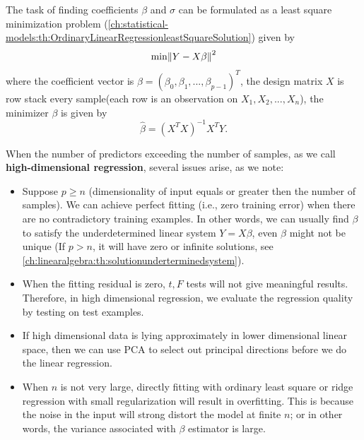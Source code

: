 \begin{refsection}
The task of finding coefficients $\beta$ and $\sigma$ can be formulated as a least square minimization problem (\autoref{ch:statistical-models:th:OrdinaryLinearRegressionleastSquareSolution}) given by
$$\min \norm{Y-X\beta}^2$$
where the coefficient vector is $\beta = (\beta_0,\beta_1,...,\beta_{p-1})^T$, the design matrix $X$ is row stack every sample(each row is an observation on $X_1,X_2,...,X_n$), the minimizer $\beta$ is given by
$$\hat{\beta} = (X^TX)^{-1}X^TY.$$

When the number of predictors exceeding the number of samples, as we call \textbf{high-dimensional regression}, several issues arise, as we note:
\begin{remark}\cite[241]{james2013introduction}
	\begin{itemize}
		\item 	Suppose $p \geq n$ (dimensionality of input equals or greater then the number of samples). We can achieve perfect fitting (i.e., zero training error) when there are no contradictory training examples. In other words, we can usually find $\beta$ to satisfy the underdetermined linear system $Y=X\beta$, even $\beta$ might not be unique (If $p>n$, it will have zero or infinite solutions, see \autoref{ch:linearalgebra:th:solutionunderterminedsystem}).
		\item When the fitting residual is zero,  $t,F$ tests will not give meaningful results. Therefore, in high dimensional regression, we evaluate the regression quality by testing on test examples.
	\end{itemize}
\end{remark}


\begin{remark}\hfill
	\begin{itemize}
		\item If high dimensional data is lying approximately in lower dimensional linear space, then we can use PCA to select out principal directions before we do the linear regression.
		\item When $n$ is not very large, directly fitting with ordinary least square or ridge regression with small regularization will result in overfitting. This is because the noise in the input will strong distort the model at finite $n$; or in other words, the variance associated with $\beta$ estimator is large.
	\end{itemize}
\end{remark}




\end{refsection}

